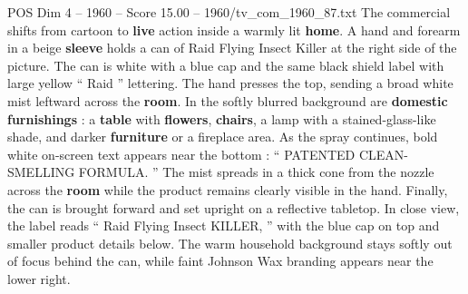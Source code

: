 \begin{textsample}{POS Dim 4 – 1960 – Score 15.00 – 1960/tv\_com\_1960\_87.txt}
The commercial shifts from cartoon to \textbf{live} action inside a warmly lit \textbf{home}.
A hand and forearm in a beige \textbf{sleeve} holds a can of Raid Flying Insect Killer at the right side of the picture.
The can is white with a blue cap and the same black shield label with large yellow “ Raid ” lettering.
The hand presses the top, sending a broad white mist leftward across the \textbf{room}.
In the softly blurred background are \textbf{domestic} \textbf{furnishings} : a \textbf{table} with \textbf{flowers}, \textbf{chairs}, a lamp with a stained-glass-like shade, and darker \textbf{furniture} or a fireplace area.
As the spray continues, bold white on-screen text appears near the bottom : “ PATENTED CLEAN-SMELLING FORMULA. ” The mist spreads in a thick cone from the nozzle across the \textbf{room} while the product remains clearly visible in the hand.
Finally, the can is brought forward and set upright on a reflective tabletop.
In close view, the label reads “ Raid Flying Insect KILLER, ” with the blue cap on top and smaller product details below.
The warm household background stays softly out of focus behind the can, while faint Johnson Wax branding appears near the lower right.

\end{textsample}
